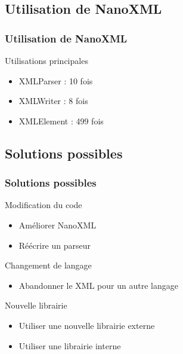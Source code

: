 \subsection{Utilisation de NanoXML}
\begin{frame}\frametitle{Utilisation de NanoXML}
\begin{beamerboxesrounded}[shadow=true]{Utilisations principales}
 \begin{itemize}
  \item XMLParser : 10 fois
  \item XMLWriter : 8 fois
  \item XMLElement : 499 fois
 \end{itemize}
\end{beamerboxesrounded}
\end{frame}
\subsection{Solutions possibles}
\begin{frame}\frametitle{Solutions possibles}
\begin{minipage}[c]{.46\linewidth}
\begin{beamerboxesrounded}[shadow=true]{Modification du code}
\begin{itemize}
	\item Améliorer NanoXML
	\item Réécrire un parseur
\end{itemize}
\end{beamerboxesrounded}
\end{minipage}
\hfill
\begin{minipage}[c]{.46\linewidth}
\begin{beamerboxesrounded}[shadow=true]{Changement de langage}
\begin{itemize}
	\item Abandonner le XML pour un autre langage
\end{itemize}
\end{beamerboxesrounded}
\end{minipage}
\vfill
\hfil
\begin{minipage}[c]{.8\linewidth}
\begin{beamerboxesrounded}[shadow=true]{Nouvelle librairie}
\begin{itemize}
	\item Utiliser une nouvelle librairie externe
	\item Utiliser une librairie interne
\end{itemize}
\end{beamerboxesrounded}
\end{minipage}
\end{frame}
